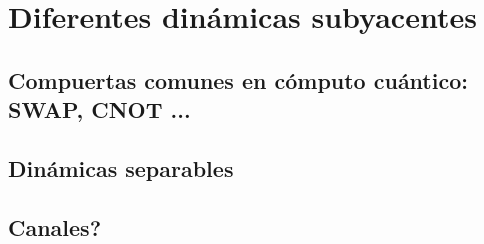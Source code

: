 \chapter{Diferentes dinámicas subyacentes}


\section{Compuertas comunes en cómputo cuántico: SWAP, CNOT ...}

\section{Dinámicas separables}

\section{Canales?}

